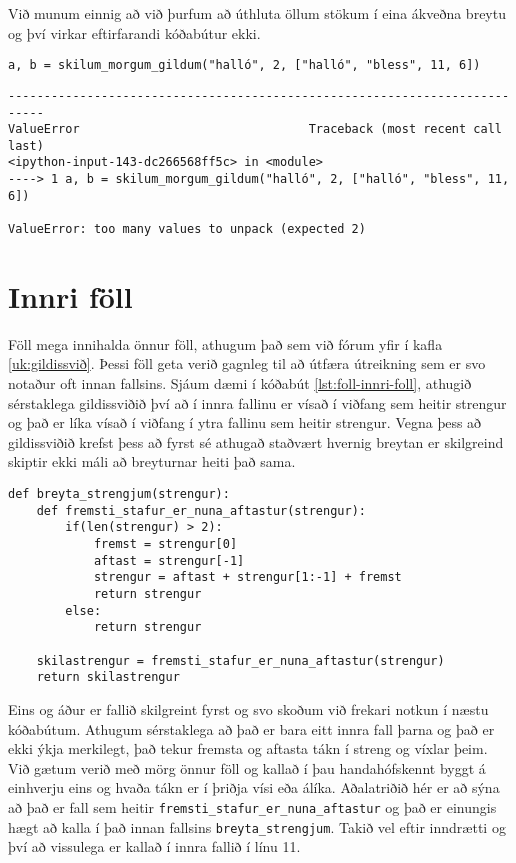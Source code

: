 Við munum einnig að við þurfum að úthluta öllum stökum í eina ákveðna breytu og því virkar eftirfarandi kóðabútur ekki.

\begin{lstlisting}[caption=Fallið úr kóðabút \ref{lst:foll-ndir-skilagildi} notað og skilagildunum úthlutað í breytur rangt, label=lst:foll-skil3]
a, b = skilum_morgum_gildum("halló", 2, ["halló", "bless", 11, 6])
\end{lstlisting}
\lstset{style=uttak}
\begin{lstlisting}
---------------------------------------------------------------------------
ValueError                                Traceback (most recent call last)
<ipython-input-143-dc266568ff5c> in <module>
----> 1 a, b = skilum_morgum_gildum("halló", 2, ["halló", "bless", 11, 6])

ValueError: too many values to unpack (expected 2)
\end{lstlisting}
\lstset{style=venjulegt}

\section{Innri föll}

Föll mega innihalda önnur föll, athugum það sem við fórum yfir í kafla \ref{uk:gildissvið}.
Þessi föll geta verið gagnleg til að útfæra útreikning sem er svo notaður oft innan fallsins.
Sjáum dæmi í kóðabút \ref{lst:foll-innri-foll}, athugið sérstaklega gildissviðið því að í innra fallinu er vísað í viðfang sem heitir strengur og það er líka vísað í viðfang í ytra fallinu sem heitir strengur.
Vegna þess að gildissviðið krefst þess að fyrst sé athugað staðvært hvernig breytan er skilgreind skiptir ekki máli að breyturnar heiti það sama.


\begin{lstlisting}[caption=Innri föll kynnt, label=lst:foll-innri-foll]
def breyta_strengjum(strengur):
	def fremsti_stafur_er_nuna_aftastur(strengur):
		if(len(strengur) > 2):
			fremst = strengur[0]
			aftast = strengur[-1]
			strengur = aftast + strengur[1:-1] + fremst
			return strengur
		else:
			return strengur

	skilastrengur = fremsti_stafur_er_nuna_aftastur(strengur)
	return skilastrengur
\end{lstlisting}

Eins og áður er fallið skilgreint fyrst og svo skoðum við frekari notkun í næstu kóðabútum.
Athugum sérstaklega að það er bara eitt innra fall þarna og það er ekki ýkja merkilegt, það tekur fremsta og aftasta tákn í streng og víxlar þeim.
Við gætum verið með mörg önnur föll og kallað í þau handahófskennt byggt á einhverju eins og hvaða tákn er í þriðja vísi eða álíka.
Aðalatriðið hér er að sýna að það er fall sem heitir \texttt{fremsti\_stafur\_er\_nuna\_aftastur} og það er einungis hægt að kalla í það innan fallsins \texttt{breyta\_strengjum}.
Takið vel eftir inndrætti og því að vissulega er kallað í innra fallið í línu 11.

